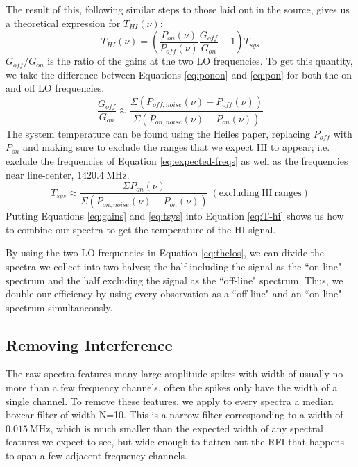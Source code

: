 \documentclass[12pt]{article}
\begin{document}
The result of this, following similar steps to those laid out in the source, gives us a theoretical expression for $T_{HI}(\nu)$:
\begin{equation}
T_{HI}(\nu) = \left(\frac{P_{on}(\nu)}{P_{off}(\nu)} \frac{G_{off}}{G_{on}} - 1\right)T_{sys} \label{eq:T-hi}
\end{equation}
$G_{off}/G_{on}$ is the ratio of the gains at the two LO frequencies. To get this quantity, we take the difference between Equations \ref{eq:ponon} and \ref{eq:pon} for both the on and off LO frequencies.
\begin{equation}
\frac{G_{off}}{G_{on}} \approx \frac{\Sigma{(P_{off,noise}(\nu) - P_{off}(\nu))}}{\Sigma{(P_{on,noise}(\nu)- P_{on}(\nu))}} \label{eq:gains}
\end{equation}
The system temperature can be found using the Heiles paper, replacing $P_{off}$ with $P_{on}$ and making sure to exclude the ranges that we expect HI to appear; i.e. exclude the frequencies of Equation \ref{eq:expected-freqs} as well as the frequencies near line-center, $1420.4\ \mathrm{MHz}$.
\begin{equation}
T_{sys} \approx \frac{\Sigma{P_{on}(\nu)}}{\Sigma{(P_{on,noise}(\nu)-P_{on}(\nu))}}\ \mathrm{(excluding\ HI\ ranges)} \label{eq:tsys}
\end{equation}
Putting Equations \ref{eq:gains} and \ref{eq:tsys} into Equation \ref{eq:T-hi} shows us how to combine our spectra to get the temperature of the HI signal.

By using the two LO frequencies in Equation \ref{eq:thelos}, we can divide the spectra we collect into two halves; the half including the signal as the ``on-line" spectrum and the half excluding the signal as the ``off-line" spectrum. Thus, we double our efficiency by using every observation as a ``off-line" and an ``on-line" spectrum simultaneously. 

\subsection*{Removing Interference}
The raw spectra features many large amplitude spikes with width of usually no more than a few frequency channels, often the spikes only have the width of a single channel. To remove these features, we apply to every spectra a median boxcar filter of width N=10. This is a narrow filter corresponding to a width of $0.015\ \mathrm{MHz}$, which is much smaller than the expected width of any spectral features we expect to see, but wide enough to flatten out the RFI that happens to span a few adjacent frequency channels.
\end{document}
